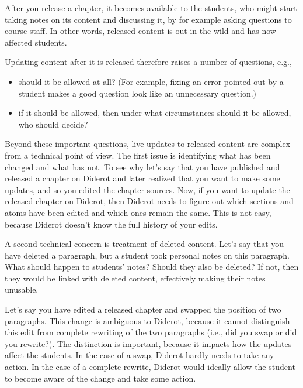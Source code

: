 \begin{gram}
\label{grm:publish::released::user-implications}
After you release a chapter, it becomes available to the students, who might start taking notes on its content and discussing it, by for example asking questions to course staff.
%
In other words, released content is out in the wild and has now affected students.
%

Updating content after it is released  therefore raises a number of questions, e.g.,
\begin{itemize}
\item should it be allowed at all? (For example, fixing an error pointed out by a student makes a good question look like an unnecessary question.)

\item if it should be allowed, then under what circumstances should it be allowed, who should decide?
\end{itemize}
\end{gram}

\begin{gram}
Beyond these important questions, live-updates  to released content are complex from a technical point of view.
%
The first issue is identifying what has been changed
and what has not.
%
To see why let's say that you have published and released a chapter on Diderot and later realized that you want to make some updates, and so you edited the chapter sources.
%
Now, if you want to update the released chapter on Diderot, then
Diderot needs to figure out which sections and atoms have been edited
and which ones remain the same.  
%
This is not easy, because Diderot doesn't know the full history of your edits.

%
A second technical concern is treatment of deleted content.  Let's say that you have deleted a paragraph, but a student took personal notes on this paragraph.  What should happen to students' notes?
%
Should they also be deleted? 
%
If not,  then they would be linked with deleted content, effectively making their notes unusable.  
\end{gram}

\begin{example}
Let's say you have edited a released chapter and swapped the position of two paragraphs.
%
This change is  ambiguous to Diderot, because it cannot
distinguish this edit from complete rewriting of the two paragraphs
(i.e., did you swap or did you rewrite?).
%
The distinction is important, because it impacts how the updates affect the students.
%
In the case of a swap, Diderot hardly needs to take any action.
%
In the case of a complete rewrite, Diderot would ideally allow the student to become aware of the change and take some action.
\end{example}


